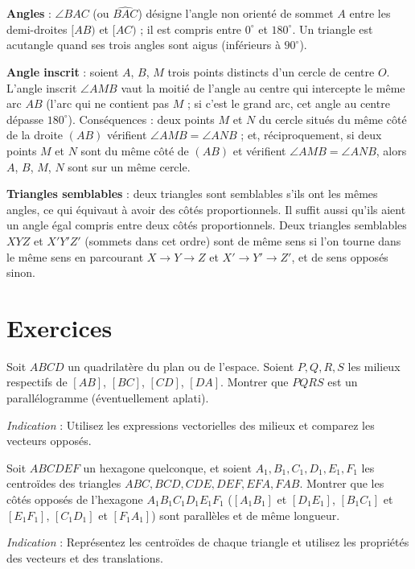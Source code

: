 \textbf{Angles} : $\angle BAC$ (ou $\widehat{BAC}$) désigne l'angle non orienté de sommet $A$ entre les demi-droites $[AB)$ et $[AC)$ ; il est compris entre $0^\circ$ et $180^\circ$. Un triangle est acutangle quand ses trois angles sont aigus (inférieurs à $90^\circ$).

\textbf{Angle inscrit} : soient $A$, $B$, $M$ trois points distincts d'un cercle de centre $O$. L'angle inscrit $\angle AMB$ vaut la moitié de l'angle au centre qui intercepte le même arc $AB$ (l'arc qui ne contient pas $M$ ; si c'est le grand arc, cet angle au centre dépasse $180^\circ$). Conséquences : deux points $M$ et $N$ du cercle situés du même côté de la droite $(AB)$ vérifient $\angle AMB=\angle ANB$ ; et, réciproquement, si deux points $M$ et $N$ sont du même côté de $(AB)$ et vérifient $\angle AMB=\angle ANB$, alors $A$, $B$, $M$, $N$ sont sur un même cercle.

\textbf{Triangles semblables} : deux triangles sont semblables s'ils ont les mêmes angles, ce qui équivaut à avoir des côtés proportionnels. Il suffit aussi qu'ils aient un angle égal compris entre deux côtés proportionnels. Deux triangles semblables $XYZ$ et $X'Y'Z'$ (sommets dans cet ordre) sont de même sens si l'on tourne dans le même sens en parcourant $X\to Y\to Z$ et $X'\to Y'\to Z'$, et de sens opposés sinon.

\section*{Exercices}

\begin{exercise}
Soit $ABCD$ un quadrilatère du plan ou de l'espace. Soient $P, Q, R, S$ les milieux respectifs de $[AB]$, $[BC]$, $[CD]$, $[DA]$. Montrer que $PQRS$ est un parallélogramme (éventuellement aplati).

\textit{Indication} : Utilisez les expressions vectorielles des milieux et comparez les vecteurs opposés.
\end{exercise}

\begin{exercise}
Soit \( ABCDEF \) un hexagone quelconque, et soient \( A_1, B_1, C_1, D_1, E_1, F_1 \) les centroïdes des triangles \( ABC, BCD, CDE, DEF, EFA, FAB \). Montrer que les côtés opposés de l’hexagone \( A_1B_1C_1D_1E_1F_1 \) ($[A_1B_1]$ et $[D_1E_1]$, $[B_1C_1]$ et $[E_1F_1]$, $[C_1D_1]$ et $[F_1A_1]$) sont parallèles et de même longueur.

\textit{Indication} : Représentez les centroïdes de chaque triangle et utilisez les propriétés des vecteurs et des translations.
\end{exercise}

